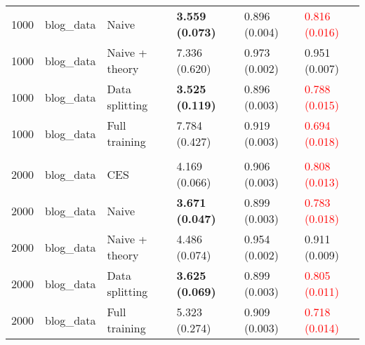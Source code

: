\begin{tabular}[t]{rlllll}
\hspace{1em}1000 & blog\_data & Naive & \textbf{3.559 (0.073)} & 0.896 (0.004) & \textcolor{red}{0.816 (0.016)}\\
\hspace{1em}1000 & blog\_data & Naive + theory & 7.336 (0.620) & 0.973 (0.002) & 0.951 (0.007)\\
\hspace{1em}1000 & blog\_data & Data splitting & \textbf{3.525 (0.119)} & 0.896 (0.003) & \textcolor{red}{0.788 (0.015)}\\
\hspace{1em}1000 & blog\_data & Full training & 7.784 (0.427) & 0.919 (0.003) & \textcolor{red}{0.694 (0.018)}\\
\addlinespace[0.3em]
\multicolumn{6}{l}{\textbf{2000}}\\
\hspace{1em}2000 & blog\_data & CES & 4.169 (0.066) & 0.906 (0.003) & \textcolor{red}{0.808 (0.013)}\\
\hspace{1em}2000 & blog\_data & Naive & \textbf{3.671 (0.047)} & 0.899 (0.003) & \textcolor{red}{0.783 (0.018)}\\
\hspace{1em}2000 & blog\_data & Naive + theory & 4.486 (0.074) & 0.954 (0.002) & 0.911 (0.009)\\
\hspace{1em}2000 & blog\_data & Data splitting & \textbf{3.625 (0.069)} & 0.899 (0.003) & \textcolor{red}{0.805 (0.011)}\\
\hspace{1em}2000 & blog\_data & Full training & 5.323 (0.274) & 0.909 (0.003) & \textcolor{red}{0.718 (0.014)}\\
\bottomrule
\end{tabular}


